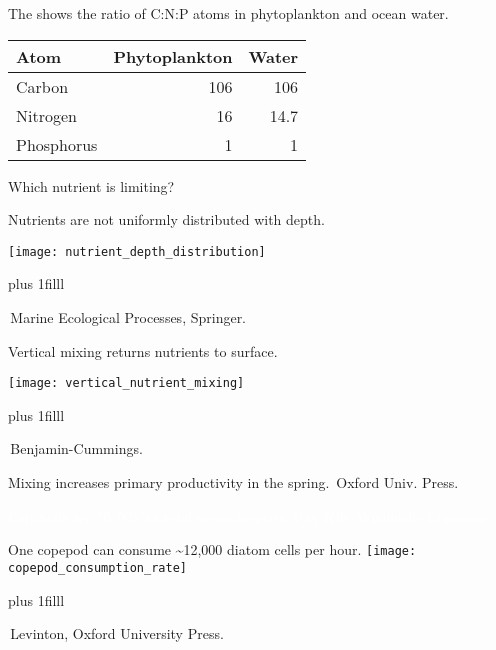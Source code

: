 \documentclass[t]{beamer}
\begin{document}
\begin{frame}[t]{The  shows the ratio of C:N:P atoms in phytoplankton and ocean water.}

\begin{center}
	\begin{tabular}{@{}lrr@{}}
	\toprule
	Atom & Phytoplankton & Water \\
	\midrule
	Carbon & 106 & 106 \\
	Nitrogen & 16 & 14.7 \\
	Phosphorus & 1 & 1 \\
	\bottomrule
	\end{tabular}
\end{center}

\hangpara Which nutrient is limiting?

\end{frame}


\begin{frame}[t]{Nutrients are not uniformly distributed with depth.}

	\texttt{[image: nutrient\_depth\_distribution]}

\vskip0pt plus 1filll

\tiny\textcopyright\,Marine Ecological Processes, Springer.
\end{frame}

\begin{frame}[t]{Vertical mixing returns nutrients to surface.}

	\texttt{[image: vertical\_nutrient\_mixing]}

\vskip0pt plus 1filll

\tiny\textcopyright\,Benjamin-Cummings.
\end{frame}

{
\begin{frame}[b]{Mixing increases primary productivity in the spring.}
\tiny\hfill\textcopyright\,Oxford Univ. Press.
\end{frame}
}

{
\begin{frame}[b]{\textcolor{white}{Copepods are 70–90\% of total ocean biomass.}}
\tiny\textcolor{white}{Uwe Kils, Wikimedia Commons}
\end{frame}
}

\begin{frame}[t]{One copepod can consume \textasciitilde12,000 diatom cells per hour.}
	\vspace*{\baselineskip}
	\texttt{[image: copepod\_consumption\_rate]}
	
	\vskip0pt plus 1filll
	
	\tiny\textcopyright\,Levinton, Oxford University Press.
\end{frame}
\end{document}
